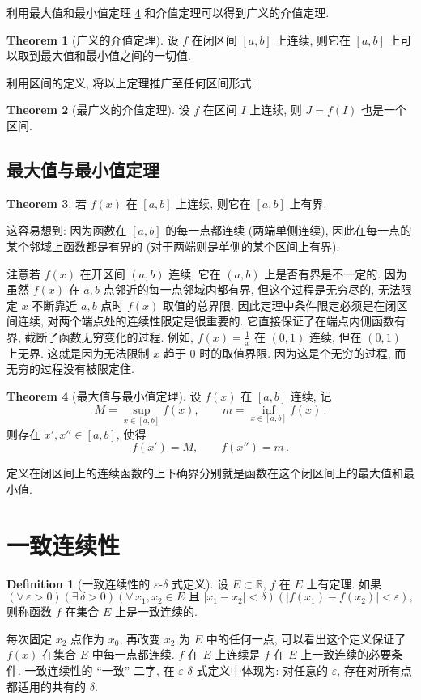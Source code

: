 \documentclass{book}
\newcommand{\Exists}{\exists\,}
\newcommand{\Any}{\forall\,}
\newcommand{\abs}[1]{\left\lvert #1 \right\rvert}
\newcommand{\R}{\mathbb{R}}
\numberwithin{equation}{section}
\numberwithin{figure}{section}
\theoremstyle{definition}
\newtheorem{definition}{Definition}
\newtheorem{theorem}{Theorem}[section]
\begin{document}
利用最大值和最小值定理 \cref{the:max_min_thm} 和介值定理可以得到广义的介值定理.
\begin{theorem}[广义的介值定理]
  设 $f$ 在闭区间 $[a,b]$ 上连续, 则它在 $[a,b]$ 上可以取到最大值和最小值之间的一切值.
\end{theorem}

利用区间的定义, 将以上定理推广至任何区间形式:
\begin{theorem}[最广义的介值定理]
  设 $f$ 在区间 $I$ 上连续, 则 $J=f(I)$ 也是一个区间.
\end{theorem}
%
\subsection{最大值与最小值定理}
\begin{theorem}
  若 $f(x)$ 在 $[a,b]$ 上连续, 则它在 $[a,b]$ 上有界.
\end{theorem}
这容易想到: 因为函数在 $[a,b]$ 的每一点都连续 (两端单侧连续), 因此在每一点的某个邻域上函数都是有界的 (对于两端则是单侧的某个区间上有界).

注意若 $f(x)$ 在开区间 $(a,b)$ 连续, 它在 $(a,b)$ 上是否有界是不一定的. 因为虽然 $f(x)$ 在 $a,b$ 点邻近的每一点邻域内都有界, 但这个过程是无穷尽的, 无法限定 $x$ 不断靠近 $a,b$ 点时 $f(x)$ 取值的总界限.
因此定理中条件限定必须是在闭区间连续, 对两个端点处的连续性限定是很重要的. 它直接保证了在端点内侧函数有界, 截断了函数无穷变化的过程.
例如,  $f(x)=\frac{1}{x}$ 在 $(0,1)$ 连续, 但在 $(0,1)$ 上无界. 这就是因为无法限制 $x$ 趋于 $0$ 时的取值界限. 因为这是个无穷的过程, 而无穷的过程没有被限定住.

\begin{theorem}[最大值与最小值定理]\label{the:max_min_thm}
  设 $f(x)$ 在 $[a,b]$ 连续, 记
  \begin{equation*}
    M=\sup_{x\in[a,b]}f(x),\qquad m=\inf_{x\in[a,b]}f(x)\,.
  \end{equation*}
  则存在 $x',x''\in[a,b]$, 使得
  \begin{equation*}
    f(x')=M,\qquad f(x'')=m\,.
  \end{equation*}
\end{theorem}
定义在闭区间上的连续函数的上下确界分别就是函数在这个闭区间上的最大值和最小值. 
%
\section{一致连续性}
\begin{definition}[一致连续性的 $\varepsilon$-$\delta$ 式定义]
  设 $E\subset\R$, $f$ 在 $E$ 上有定理.
  如果
  \begin{equation*}
    (\Any\varepsilon>0)(\Exists \delta>0)(\Any x_1,x_2\in E \text{ 且 }\abs{x_1-x_2}<\delta)(\abs{f(x_1)-f(x_2)}<\varepsilon),
  \end{equation*}
  则称函数 $f$ 在集合 $E$ 上是一致连续的.
\end{definition}
每次固定 $x_2$ 点作为 $x_0$, 再改变 $x_2$ 为 $E$ 中的任何一点, 可以看出这个定义保证了 $f(x)$ 在集合 $E$ 中每一点都连续. $f$ 在 $E$ 上连续是 $f$ 在 $E$ 上一致连续的必要条件.
一致连续性的 ``一致'' 二字, 在 $\varepsilon$-$\delta$ 式定义中体现为: 对任意的 $\varepsilon$, 存在对所有点都适用的共有的 $\delta$.
\end{document}
